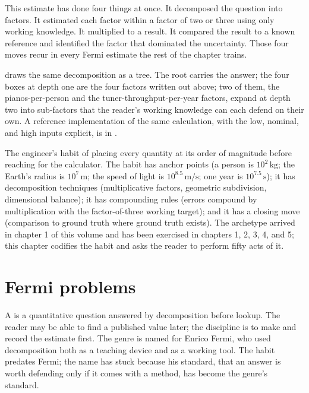 This estimate has done four things at once. It decomposed the question
into factors. It estimated each factor within a factor of two or three
using only working knowledge. It multiplied to a result. It compared
the result to a known reference and identified the factor that
dominated the uncertainty. Those four moves recur in every Fermi
estimate the rest of the chapter trains.

 draws the same decomposition as a
tree. The root carries the answer; the four boxes at depth one are
the four factors written out above; two of them, the pianos-per-person
and the tuner-throughput-per-year factors, expand at depth two into
sub-factors that the reader's working knowledge can each defend on
their own. A reference implementation of the same calculation, with
the low, nominal, and high inputs explicit, is in
.



\begin{archetype}
The engineer's habit of placing every quantity at its order of magnitude
before reaching for the calculator. The habit has anchor points (a
person is $10^{2} \,\si{\kilogram}$; the Earth's radius is
$10^{7} \,\si{\meter}$; the speed of light is $10^{8.5} \,\si{\meter\per
\second}$; one year is $10^{7.5} \,\si{\second}$); it has decomposition
techniques (multiplicative factors, geometric subdivision, dimensional
balance); it has compounding rules (errors compound by multiplication
with the factor-of-three working target); and it has a closing move
(comparison to ground truth where ground truth exists). The archetype
arrived in chapter 1 of this volume and has been exercised in chapters
1, 2, 3, 4, and 5; this chapter codifies the habit and asks the reader
to perform fifty acts of it.
\end{archetype}

\section{Fermi problems}

A  is a quantitative question answered by
decomposition before lookup. The reader may be able to find a published
value later; the discipline is to make and record the estimate first.
The genre is named for Enrico Fermi, who used decomposition both as a
teaching device and as a working tool. The habit predates Fermi; the
name has stuck because his standard, that an answer is worth defending
only if it comes with a method, has become the genre's standard.

